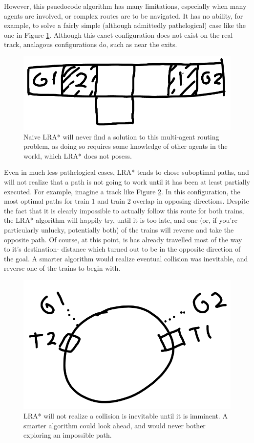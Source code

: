\documentclass{article}
\begin{document}
However, this psuedocode algorithm has many limitations, especially when many
agents are involved, or complex routes are to be navigated. It has no ability,
for example, to solve a fairly simple (although admittedly pathelogical) case
like the one in Figure \ref{fig:LRA*-unsolveable}. Although this exact
configuration does not exist on the real track, analagous configurations do,
such as near the exits.
\begin{figure}
\caption{Naive LRA* will never find a solution to this multi-agent routing
problem, as doing so requires some knowledge of other agents in the world,
which LRA* does not posess.}
\label{fig:LRA*-unsolveable}
\includegraphics[width=\linewidth]{LRA*-unsolveable.png}
\end{figure}

Even in much less pathelogical cases, LRA* tends to chose suboptimal paths,
and will not realize that a path is not going to work until it has been at
least partially executed. For example, imagine a track like
Figure \ref{fig:LRA*-suboptimal}. In this configuration, the most optimal
paths for train 1 and train 2 overlap in opposing directions. Despite the
fact that it is clearly impossible to actually follow this route for both
trains, the LRA* algorithm will happily try, until it is too late, and one
(or, if you're particularly unlucky, potentially both) of the trains will
reverse and take the opposite path. Of course, at this point, is has already
travelled most of the way to it's destination- distance which turned out to
be in the opposite direction of the goal. A smarter algorithm would realize
eventual collision was inevitable, and reverse one of the trains to begin with.
\begin{figure}
\caption{LRA* will not realize a collision is inevitable until it is imminent.
A smarter algorithm could look ahead, and would never bother exploring an
impossible path.}
\label{fig:LRA*-suboptimal}
\includegraphics[width=\linewidth]{LRA*-suboptimal.png}
\end{figure}
\end{document}
